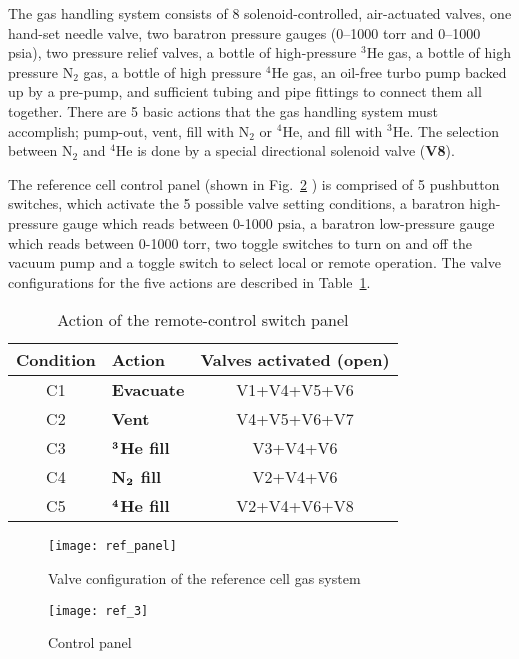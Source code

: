 {The gas handling system consists of 8 solenoid-controlled,
air-actuated valves, one hand-set needle valve, two baratron pressure
gauges (0--1000 torr and 0--1000 psia), two pressure relief valves, a
bottle of high-pressure $^3$He gas, a bottle of high pressure N$_2$
gas, a bottle of high pressure $^{4}$He gas, an oil-free turbo pump
backed up by a pre-pump, and sufficient tubing and pipe fittings to
connect them all together.  There are 5 basic actions that the gas
handling system must accomplish; pump-out, vent, fill with N$_2$ or
$^{4}$He, and fill with $^3$He.  The selection between N$_2$ and
$^{4}$He is done by a special directional solenoid valve ({\bf V8}).

The reference cell control panel (shown in Fig.~\ref{fig:refcell3} )
is comprised of 5 pushbutton switches, which activate the 5 possible
valve setting conditions, a baratron high-pressure gauge which reads
between 0-1000 psia, a baratron low-pressure gauge which reads between
0-1000 torr, two toggle switches to turn on and off the vacuum pump
and a toggle switch to select local or remote operation.  The valve
configurations for the five actions are described in
Table~\ref{tab:refcell}.

\begin{table}
\begin{center}
\begin{tabular}{|c|l|c|}
\hline\hline
Condition & Action & Valves activated (open) \rule[-2.5mm]{0mm}{7mm}\\
\hline
C1 & {\bf Evacuate} & V1+V4+V5+V6 \\
C2 & {\bf Vent} & V4+V5+V6+V7 \\
C3 & {\bf $\bf ^3$He fill} & V3+V4+V6 \\
C4 & {\bf N$\bf _2$ fill } & V2+V4+V6 \\
C5 & {\bf $\bf ^4$He fill } & V2+V4+V6+V8 \\
\hline\hline
\end{tabular}
\caption{Action of the remote-control switch panel}
\label{tab:refcell}
\end{center}
\end{table}
\begin{figure}
\begin{center}
\centerline{ \texttt{[image: ref\_panel]}}
\caption{Valve configuration of the reference cell gas system}
\label{fig:refcell2}
\end{center}
\end{figure}

\begin{figure}
\begin{center}
\centerline{\texttt{[image: ref\_3]}}
\caption{Control panel}
\label{fig:refcell3}
\end{center}
\end{figure}


}
